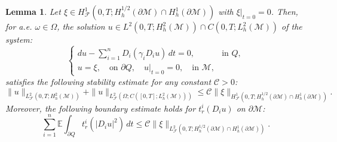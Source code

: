 \documentclass[11pt,oneside,leqno]{amsart}
\numberwithin{equation}{section}
\numberwithin{equation}{section}
\newtheorem{lemma}[theorem]{Lemma}
\begin{document}
\begin{lemma}\label{lemmaoftheu}
Let $\xi \in H_{\mathcal{F}}^1(0,T; H_h^{1/2}(\partial \mathcal{M}) \cap H_h^1(\partial \mathcal{M}))$ with $\left.\xi\right|_{t=0} = 0$. Then, for a.e. $\omega \in \Omega$, the solution $u \in L^2(0,T; H_h^2(\mathcal{M})) \cap C(0,T; L_h^2(\mathcal{M}))$ of the system:
\begin{equation}\label{sys:homogeneuous}
    \begin{cases}
    du - \sum_{i=1}^{n} D_i(\gamma_i D_i u) \, dt = 0, & \text{in } Q, \\
    u = \xi,\quad\text{on } \partial Q,\quad \left.u\right|_{t=0} = 0,\quad  \text{in } \mathcal{M},
    \end{cases}
\end{equation}
satisfies the following stability estimate for any constant $\mathcal{C} > 0$:
\begin{equation}\label{ine:stability:H2}
    \|u\|_{L^2_{\mathcal{F}}(0,T; H_h^2(\mathcal{M}))} + \|u\|_{L^2_{\mathcal{F}}(\Omega; C([0,T]; L_h^2(\mathcal{M})))} \leq \mathcal{C} \|\xi\|_{H^1_{\mathcal{F}}(0,T; H_h^{1/2}(\partial \mathcal{M}) \cap H_h^1(\partial \mathcal{M}))}.
\end{equation}
Moreover, the following boundary estimate holds for $t_r^i(D_i u)$ on $\partial\mathcal{M}$:
\begin{equation}\label{ine:stability:boundary}
    \sum_{i=1}^{n} \mathbb{E} \int_{\partial Q} t_r^i(|D_i u|^2) \, dt \leq \mathcal{C} \|\xi\|_{L^2_{\mathcal{F}}(0,T; H_h^{1/2}(\partial \mathcal{M}) \cap H_h^1(\partial \mathcal{M}))}.
\end{equation}
\end{lemma}
\end{document}
